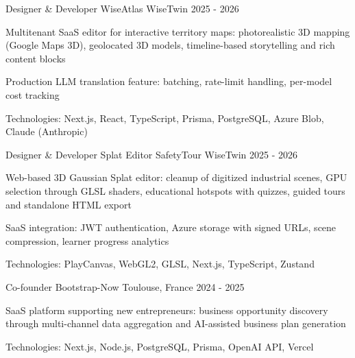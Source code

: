 


\begin{cventries}


\cventry
{Designer \& Developer} %
{WiseAtlas} %
{WiseTwin} %
{2025 - 2026} %
{ %
\begin{cvitems}
\item {Multitenant SaaS editor for interactive territory maps: photorealistic 3D mapping (Google Maps 3D), geolocated 3D models, timeline-based storytelling and rich content blocks}
\item {Production LLM translation feature: batching, rate-limit handling, per-model cost tracking}
\item {Technologies: Next.js, React, TypeScript, Prisma, PostgreSQL, Azure Blob, Claude (Anthropic)}
\end{cvitems}
}
\vspace{1.5em}


\cventry
{Designer \& Developer} %
{Splat Editor SafetyTour} %
{WiseTwin} %
{2025 - 2026} %
{ %
\begin{cvitems}
\item {Web-based 3D Gaussian Splat editor: cleanup of digitized industrial scenes, GPU selection through GLSL shaders, educational hotspots with quizzes, guided tours and standalone HTML export}
\item {SaaS integration: JWT authentication, Azure storage with signed URLs, scene compression, learner progress analytics}
\item {Technologies: PlayCanvas, WebGL2, GLSL, Next.js, TypeScript, Zustand}
\end{cvitems}
}
\vspace{1.5em}


\cventry
{Co-founder} %
{Bootstrap-Now} %
{Toulouse, France} %
{2024 - 2025} %
{ %
\begin{cvitems}
\item {SaaS platform supporting new entrepreneurs: business opportunity discovery through multi-channel data aggregation and AI-assisted business plan generation}
\item {Technologies: Next.js, Node.js, PostgreSQL, Prisma, OpenAI API, Vercel}
\end{cvitems}
}


\end{cventries}
